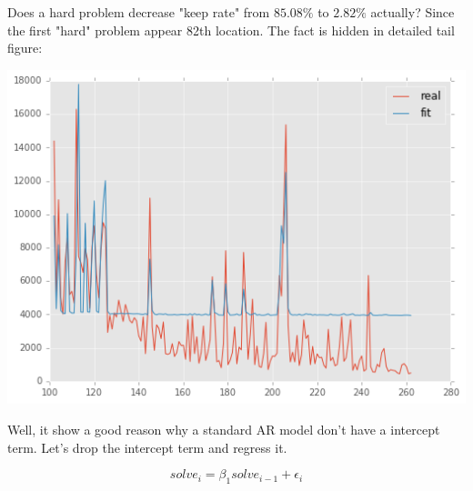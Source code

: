 \documentclass{article}
\begin{document}
Does a hard problem decrease "keep rate" from $85.08\%$ to $2.82\%$ actually? Since the first "hard" problem appear
82th location. The fact is hidden in detailed tail figure:

\includegraphics[scale=0.55]{tail.png}

Well, it show a good reason why a standard AR model don't have a intercept term. Let's drop the intercept term and
regress it.

\[
solve_i = \beta_1 solve_{i-1} + \epsilon_i
\]
\end{document}
